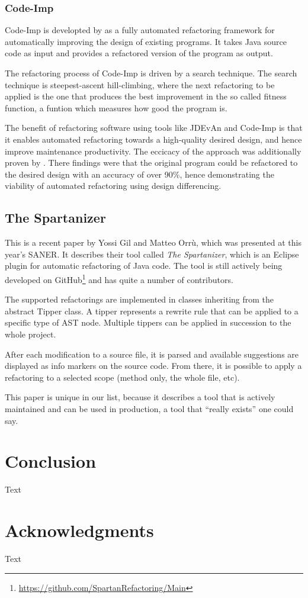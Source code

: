 \documentclass[conference,compsoc,a4paper]{IEEEtran}
\newcommand{\code}[1]{{\small\ttfamily #1}}
\begin{document}
\subsubsection{Code-Imp}
Code-Imp is developted by \cite{2008502} \cite{5313} \cite{bibid} as a fully automated refactoring framework for automatically improving the design of existing programs. It takes Java source code as input and provides a refactored version of the program as output.

The refactoring process of Code-Imp is driven by a search technique. The search technique is steepest-ascent hill-climbing, where the next refactoring to be applied is the one that produces the best improvement in the so called fitness function, a funtion which measures how good the program is.

The benefit of refactoring software using tools like JDEvAn and Code-Imp is that it enables automated refactoring towards a high-quality desired design, and hence improve maintenance productivity. The eccicacy of the approach was additionally proven by \cite{design-diff}. There findings were that the original program could be refactored to the desired design with an accuracy of over 90\%, hence	demonstrating the viability of automated refactoring using design differencing.

\subsection{The Spartanizer}

This is a recent paper by Yossi Gil and Matteo Orrù, which was presented at this year's SANER. It describes their tool 
called \emph{The Spartanizer}, which is an Eclipse plugin for automatic refactoring of Java code. The tool is still 
actively being developed on GitHub\footnote{\url{https://github.com/SpartanRefactoring/Main}} and has quite a number of 
contributors.

The supported refactorings are implemented in classes inheriting from the abstract \code{Tipper} class. A tipper 
represents a rewrite rule that can be applied to a specific type of AST node. Multiple tippers can be applied in 
succession to the whole project.

After each modification to a source file, it is parsed and available suggestions are displayed as info markers on the 
source code. From there, it is possible to apply a refactoring to a selected scope (method only, the whole file, etc).

This paper is unique in our list, because it describes a tool that is actively maintained and can be used in 
production, a tool that \enquote{really exists} one could say.


\section{Conclusion}

Text


\section*{Acknowledgments}

Text






\end{document}
